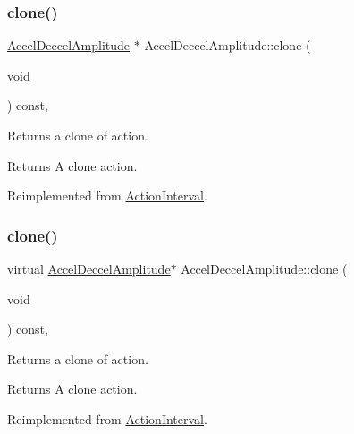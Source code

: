 \subsubsection{\texorpdfstring{clone()}{clone()}\hspace{0.1cm}{\footnotesize\ttfamily [1/2]}}
{\footnotesize\ttfamily \hyperlink{classAccelDeccelAmplitude}{Accel\+Deccel\+Amplitude} $\ast$ Accel\+Deccel\+Amplitude\+::clone (\begin{DoxyParamCaption}\item[{void}]{ }\end{DoxyParamCaption}) const\hspace{0.3cm}{\ttfamily [override]}, {\ttfamily [virtual]}}

Returns a clone of action.

\begin{DoxyReturn}{Returns}
A clone action. 
\end{DoxyReturn}


Reimplemented from \hyperlink{classActionInterval_abc93ce0c2f54a90eb216a7803f25f44a}{Action\+Interval}.

\mbox{\label{classAccelDeccelAmplitude_a27eb88b47e9d6176029f62c7ec24a373}} 
\subsubsection{\texorpdfstring{clone()}{clone()}\hspace{0.1cm}{\footnotesize\ttfamily [2/2]}}
{\footnotesize\ttfamily virtual \hyperlink{classAccelDeccelAmplitude}{Accel\+Deccel\+Amplitude}$\ast$ Accel\+Deccel\+Amplitude\+::clone (\begin{DoxyParamCaption}\item[{void}]{ }\end{DoxyParamCaption}) const\hspace{0.3cm}{\ttfamily [override]}, {\ttfamily [virtual]}}

Returns a clone of action.

\begin{DoxyReturn}{Returns}
A clone action. 
\end{DoxyReturn}


Reimplemented from \hyperlink{classActionInterval_abc93ce0c2f54a90eb216a7803f25f44a}{Action\+Interval}.

